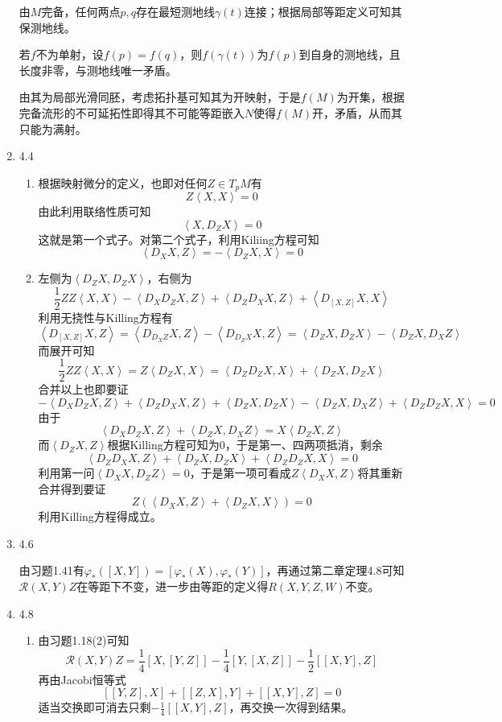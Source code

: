\documentclass[a4paper,UTF8,fontset=windows,10pt]{ctexart}
\begin{document}
\begin{enumerate}
    由$M$完备，任何两点$p,q$存在最短测地线$\gamma(t)$连接；根据局部等距定义可知其保测地线。
    
    若$f$不为单射，设$f(p)=f(q)$，则$f(\gamma(t))$为$f(p)$到自身的测地线，且长度非零，与测地线唯一矛盾。
    
    由其为局部光滑同胚，考虑拓扑基可知其为开映射，于是$f(M)$为开集，根据完备流形的不可延拓性即得其不可能等距嵌入$N$使得$f(M)$开，矛盾，从而其只能为满射。
    
    \item 4.4
    \begin{enumerate}[(1)]
        \item 根据映射微分的定义，也即对任何$Z\in T_pM$有
        $$Z\left<X,X\right>=0$$
        由此利用联络性质可知
        $$\left<X,D_ZX\right>=0$$
        这就是第一个式子。对第二个式子，利用Kiliing方程可知
        $$\left<D_XX,Z\right>=-\left<D_ZX,X\right>=0$$
    
        \item 左侧为$\left<D_ZX,D_ZX\right>$，右侧为
        $$\frac{1}{2}ZZ\left<X,X\right>-\left<D_XD_ZX,Z\right>+\left<D_ZD_XX,Z\right>+\left<D_{[X,Z]}X,X\right>$$
        利用无挠性与Killing方程有
        $$\left<D_{[X,Z]}X,Z\right>=\left<D_{D_XZ}X,Z\right>-\left<D_{D_ZX}X,Z\right>=\left<D_ZX,D_ZX\right>-\left<D_ZX,D_XZ\right>$$
        而展开可知
        $$\frac{1}{2}ZZ\left<X,X\right>=Z\left<D_ZX,X\right>=\left<D_ZD_ZX,X\right>+\left<D_ZX,D_ZX\right>$$
        合并以上也即要证
        $$-\left<D_XD_ZX,Z\right>+\left<D_ZD_XX,Z\right>+\left<D_ZX,D_ZX\right>-\left<D_ZX,D_XZ\right>+\left<D_ZD_ZX,X\right>=0$$
        由于
        $$\left<D_XD_ZX,Z\right>+\left<D_ZX,D_XZ\right>=X\left<D_ZX,Z\right>$$
        而$\left<D_ZX,Z\right>$根据Killing方程可知为0，于是第一、四两项抵消，剩余
        $$\left<D_ZD_XX,Z\right>+\left<D_ZX,D_ZX\right>+\left<D_ZD_ZX,X\right>=0$$
        利用第一问$\left<D_XX,D_ZZ\right>=0$，于是第一项可看成$Z\left<D_XX,Z\right>$将其重新合并得到要证
        $$Z(\left<D_XX,Z\right>+\left<D_ZX,X\right>)=0$$
        利用Killing方程得成立。
    \end{enumerate}
    
    \item 4.6
    
    由习题1.41有$\varphi_*([X,Y])=[\varphi_*(X),\varphi_*(Y)]$，再通过第二章定理4.8可知$\mathcal{R}(X,Y)Z$在等距下不变，进一步由等距的定义得$R(X,Y,Z,W)$不变。 
    
    \item 4.8
    \begin{enumerate}[(1)]
        \item 由习题1.18(2)可知
        $$\mathcal{R}(X,Y)Z=\frac{1}{4}[X,[Y,Z]]-\frac{1}{4}[Y,[X,Z]]-\frac{1}{2}[[X,Y],Z]$$
        再由Jacobi恒等式
        $$[[Y,Z],X]+[[Z,X],Y]+[[X,Y],Z]=0$$
        适当交换即可消去只剩$-\frac{1}{4}[[X,Y],Z]$，再交换一次得到结果。
    

\end{enumerate}
\end{enumerate}
\end{document}
